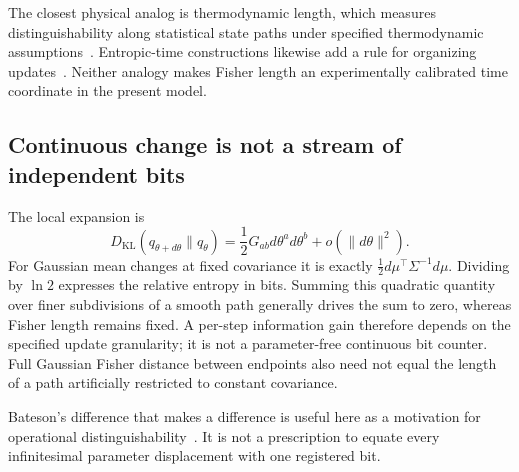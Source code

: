 The closest physical analog is thermodynamic length, which measures distinguishability along statistical state paths under specified thermodynamic assumptions~\cite{SalamonBerry1983,Crooks2007}. Entropic-time constructions likewise add a rule for organizing updates~\cite{Caticha2011entropic}. Neither analogy makes Fisher length an experimentally calibrated time coordinate in the present model.

\subsection{Continuous change is not a stream of independent bits}
The local expansion is
\begin{equation}
D_{\mathrm{KL}}(q_{\theta+d\theta}\|q_\theta)
=\frac12G_{ab}d\theta^a d\theta^b+o(\|d\theta\|^2).
\label{eq:kl_arclength}
\end{equation}
For Gaussian mean changes at fixed covariance it is exactly
$\tfrac12d\mu^\top\Sigma^{-1}d\mu$. Dividing by $\ln2$ expresses the relative entropy in bits. Summing this quadratic quantity over finer subdivisions of a smooth path generally drives the sum to zero, whereas Fisher length remains fixed. A per-step information gain therefore depends on the specified update granularity; it is not a parameter-free continuous bit counter. Full Gaussian Fisher distance between endpoints also need not equal the length of a path artificially restricted to constant covariance.

Bateson's difference that makes a difference is useful here as a motivation for operational distinguishability~\cite{Bateson1972}. It is not a prescription to equate every infinitesimal parameter displacement with one registered bit.

